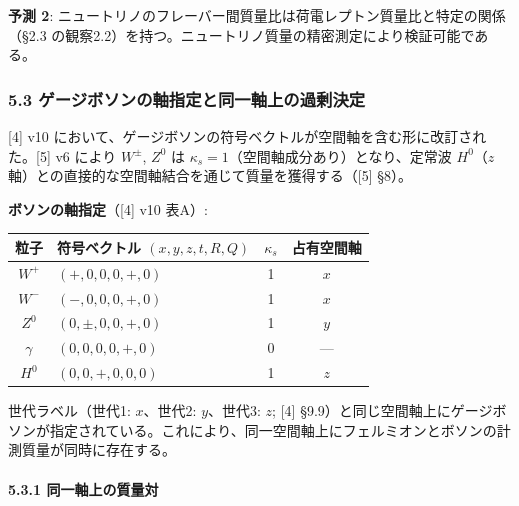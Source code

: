 \documentclass[
  a4paper,11pt]{ltjsarticle}
\newcounter{none} %
\begin{document}
\textbf{予測 2}:
ニュートリノのフレーバー間質量比は荷電レプトン質量比と特定の関係（§2.3
の観察2.2）を持つ。ニュートリノ質量の精密測定により検証可能である。

\subsubsection{5.3
ゲージボソンの軸指定と同一軸上の過剰決定}\label{ux30b2ux30fcux30b8ux30dcux30bdux30f3ux306eux8ef8ux6307ux5b9aux3068ux540cux4e00ux8ef8ux4e0aux306eux904eux5270ux6c7aux5b9a}

{[}4{]} v10
において、ゲージボソンの符号ベクトルが空間軸を含む形に改訂された。{[}5{]}
v6 により \(W^{\pm}\), \(Z^0\) は
\(\kappa_s = 1\)（空間軸成分あり）となり、定常波 \(H^0\)（\(z\)
軸）との直接的な空間軸結合を通じて質量を獲得する（{[}5{]} §8）。

\textbf{ボソンの軸指定}（{[}4{]} v10 表A）:

{\def\LTcaptype{none} %
\begin{longtable}[]{@{}clcc@{}}
\toprule\noalign{}
粒子 & 符号ベクトル \((x, y, z, t, R, Q)\) & \(\kappa_s\) &
占有空間軸 \\
\midrule\noalign{}
\endhead
\bottomrule\noalign{}
\endlastfoot
\(W^+\) & \((+, 0, 0, 0, +, 0)\) & 1 & \(x\) \\
\(W^-\) & \((-, 0, 0, 0, +, 0)\) & 1 & \(x\) \\
\(Z^0\) & \((0, \pm, 0, 0, +, 0)\) & 1 & \(y\) \\
\(\gamma\) & \((0, 0, 0, 0, +, 0)\) & 0 & --- \\
\(H^0\) & \((0, 0, +, 0, 0, 0)\) & 1 & \(z\) \\
\end{longtable}
}

世代ラベル（世代1: \(x\)、世代2: \(y\)、世代3: \(z\); {[}4{]}
§9.9）と同じ空間軸上にゲージボソンが指定されている。これにより、同一空間軸上にフェルミオンとボソンの計測質量が同時に存在する。

\paragraph{5.3.1
同一軸上の質量対}\label{ux540cux4e00ux8ef8ux4e0aux306eux8ceaux91cfux5bfe}
\end{document}
